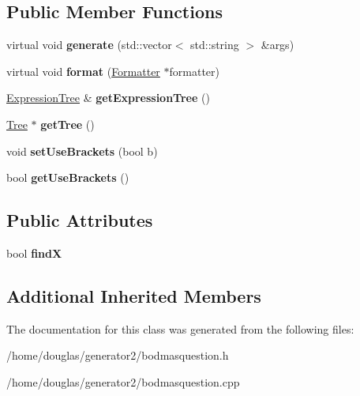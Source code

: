 \subsection*{Public Member Functions}
\begin{DoxyCompactItemize}
\item 
virtual void {\bfseries generate} (std\+::vector$<$ std\+::string $>$ \&args)\hypertarget{classBodmasQuestion_a038609cfb6e17dea3ac335bf0fe6d860}{}\label{classBodmasQuestion_a038609cfb6e17dea3ac335bf0fe6d860}

\item 
virtual void {\bfseries format} (\hyperlink{classFormatter}{Formatter} $\ast$formatter)\hypertarget{classBodmasQuestion_a1e32206630a1df311ee5892005be441a}{}\label{classBodmasQuestion_a1e32206630a1df311ee5892005be441a}

\item 
\hyperlink{classExpressionTree}{Expression\+Tree} \& {\bfseries get\+Expression\+Tree} ()\hypertarget{classBodmasQuestion_a01cc51ae727f34521e39e8b723d3ea07}{}\label{classBodmasQuestion_a01cc51ae727f34521e39e8b723d3ea07}

\item 
\hyperlink{classTree}{Tree} $\ast$ {\bfseries get\+Tree} ()\hypertarget{classBodmasQuestion_ac274319dd340fa904b4a39f138265e8d}{}\label{classBodmasQuestion_ac274319dd340fa904b4a39f138265e8d}

\item 
void {\bfseries set\+Use\+Brackets} (bool b)\hypertarget{classBodmasQuestion_a13d0f843233d5423eb99727222e61a78}{}\label{classBodmasQuestion_a13d0f843233d5423eb99727222e61a78}

\item 
bool {\bfseries get\+Use\+Brackets} ()\hypertarget{classBodmasQuestion_affe33694bfa12a150e214f3e8eb3c1e7}{}\label{classBodmasQuestion_affe33694bfa12a150e214f3e8eb3c1e7}

\end{DoxyCompactItemize}
\subsection*{Public Attributes}
\begin{DoxyCompactItemize}
\item 
bool {\bfseries findX}\hypertarget{classBodmasQuestion_acc429143732f93192814cafa27987c2d}{}\label{classBodmasQuestion_acc429143732f93192814cafa27987c2d}

\end{DoxyCompactItemize}
\subsection*{Additional Inherited Members}


The documentation for this class was generated from the following files\+:\begin{DoxyCompactItemize}
\item 
/home/douglas/generator2/bodmasquestion.\+h\item 
/home/douglas/generator2/bodmasquestion.\+cpp\end{DoxyCompactItemize}
